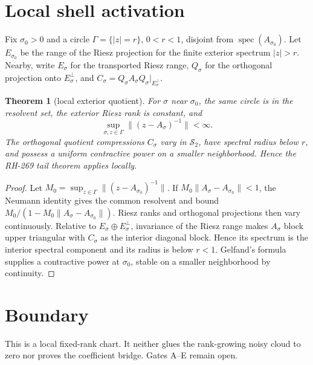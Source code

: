 \documentclass[11pt]{article}
\newtheorem{theorem}{Theorem}[section]\newtheorem{corollary}[theorem]{Corollary}
\theoremstyle{remark}\newtheorem{remark}[theorem]{Remark}
\begin{document}
\section{Local shell activation}
Fix $\sigma_0>0$ and a circle $\Gamma=\{|z|=r\}$, $0<r<1$, disjoint from
$\operatorname{spec}(A_{\sigma_0})$.  Let $E_{\sigma_0}$ be the range of the
Riesz projection for the finite exterior spectrum $|z|>r$.  Nearby, write
$E_\sigma$ for the transported Riesz range, $Q_\sigma$ for the orthogonal
projection onto $E_\sigma^\perp$, and
$C_\sigma=Q_\sigma A_\sigma Q_\sigma|_{E_\sigma^\perp}$.
\begin{theorem}[local exterior quotient]
For $\sigma$ near $\sigma_0$, the same circle is in the resolvent set, the
exterior Riesz rank is constant, and
\[
 \sup_{\sigma,z\in\Gamma}\|(z-A_\sigma)^{-1}\|<\infty.
\]
The orthogonal quotient compressions $C_\sigma$ vary in $\mathcal S_2$, have
spectral radius below $r$, and possess a uniform contractive power on a
smaller neighborhood.  Hence the RH-269 tail theorem applies locally.
\end{theorem}
\begin{proof}
Let $M_0=\sup_{z\in\Gamma}\|(z-A_{\sigma_0})^{-1}\|$.  If
$M_0\|A_\sigma-A_{\sigma_0}\|<1$, the Neumann identity gives the common
resolvent and bound $M_0/(1-M_0\|A_\sigma-A_{\sigma_0}\|)$.  Riesz ranks and
orthogonal projections then vary continuously.  Relative to
$E_\sigma\oplus E_\sigma^\perp$, invariance of the Riesz range makes
$A_\sigma$ block upper triangular with $C_\sigma$ as the interior diagonal
block.  Hence its spectrum is the interior spectral component and its radius
is below $r<1$.  Gelfand's formula supplies a contractive power at
$\sigma_0$, stable on a smaller neighborhood by continuity.
\end{proof}
\section{Boundary}
This is a local fixed-rank chart.  It neither glues the rank-growing noisy
cloud to zero nor proves the coefficient bridge.  Gates A--E remain open.
\end{document}
